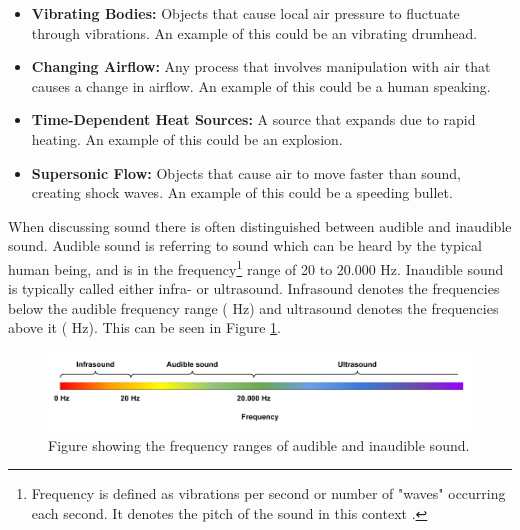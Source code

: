 \begin{itemize}
    \item \textbf{Vibrating Bodies:} Objects that cause local air pressure to fluctuate through vibrations. An example of this could be an vibrating drumhead. 
    \item \textbf{Changing Airflow:} Any process that involves manipulation with air that causes a change in airflow. An example of this could be a human speaking. 
    \item \textbf{Time-Dependent Heat Sources:} A source that expands due to rapid heating. An example of this could be an explosion.     
    \item \textbf{Supersonic Flow:} Objects that cause air to move faster than sound, creating shock waves. An example of this could be a speeding bullet. 
\end{itemize}




When discussing sound there is often distinguished between audible and inaudible sound. Audible sound is referring to sound which can be heard by the typical human being, and is in the frequency\footnote{Frequency is defined as vibrations per second or number of "waves" occurring each second. It denotes the pitch of the sound in this context \cite{Acoustics:Frequency_definition}.} range of 20 to 20.000 Hz. Inaudible sound is typically called either infra- or ultrasound. Infrasound denotes the frequencies below the audible frequency range ( Hz) and ultrasound denotes the frequencies above it ( Hz). This can be seen in Figure \ref{Sound:frequency_ranges}. \cite{Acoustics:Handbook_of_Acoustics,Acoustics:Neuroscience_Hearing_frequency}   

\begin{figure}[H]
    \centering
    \includegraphics[width=1.05\textwidth]{figures/1Problem_analysis/Audible_and_inaudible_sound.pdf}
    \caption{Figure showing the frequency ranges of audible and inaudible sound.}
    \label{Sound:frequency_ranges}
\end{figure}

